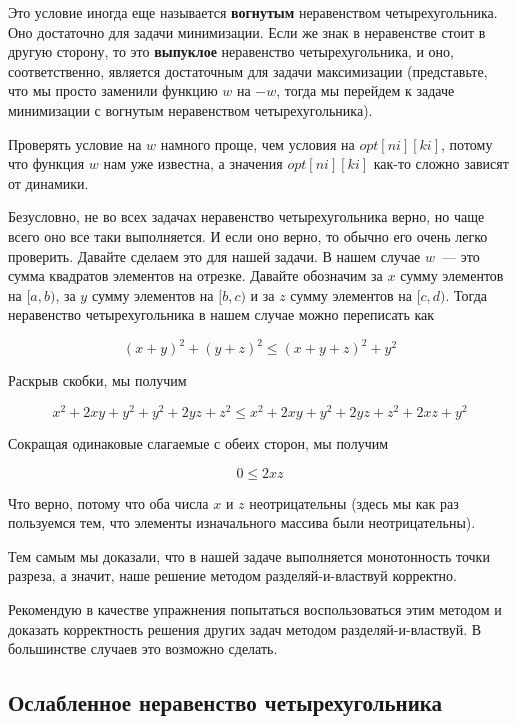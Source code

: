 \begin{observation}
    Это условие иногда еще называется \textbf{вогнутым} неравенством четырехугольника. Оно достаточно для задачи минимизации. Если же знак в неравенстве стоит в другую сторону, то это \textbf{выпуклое} неравенство четырехугольника, и оно, соответственно, является достаточным для задачи максимизации (представьте, что мы просто заменили функцию $w$ на $-w$, тогда мы перейдем к задаче минимизации с вогнутым неравенством четырехугольника).
\end{observation}

Проверять условие на $w$ намного проще, чем условия на $opt[ni][ki]$, потому что функция $w$ нам уже известна, а значения $opt[ni][ki]$ как-то сложно зависят от динамики.

Безусловно, не во всех задачах неравенство четырехугольника верно, но чаще всего оно все таки выполняется. И если оно верно, то обычно его очень легко проверить. Давайте сделаем это для нашей задачи. В нашем случае $w$~--- это сумма квадратов элементов на отрезке. Давайте обозначим за $x$ сумму элементов на $[a, b)$, за $y$ сумму элементов на $[b, c)$ и за $z$ сумму элементов на $[c, d)$. Тогда неравенство четырехугольника в нашем случае можно переписать как

$$(x + y)^2 + (y + z)^2 \le (x + y + z)^2 + y^2$$

Раскрыв скобки, мы получим

$$x^2 + 2xy + y^2 + y^2 + 2yz + z^2 \le x^2 + 2xy + y^2 + 2yz + z^2 + 2xz + y^2$$

Сокращая одинаковые слагаемые с обеих сторон, мы получим

$$0 \le 2xz$$

Что верно, потому что оба числа $x$ и $z$ неотрицательны (здесь мы как раз пользуемся тем, что элементы изначального массива были неотрицательны).

Тем самым мы доказали, что в нашей задаче выполняется монотонность точки разреза, а значит, наше решение методом разделяй-и-властвуй корректно.

Рекомендую в качестве упражнения попытаться воспользоваться этим методом и доказать корректность решения других задач методом разделяй-и-властвуй. В большинстве случаев это возможно сделать.

\subsection{Ослабленное неравенство четырехугольника}

